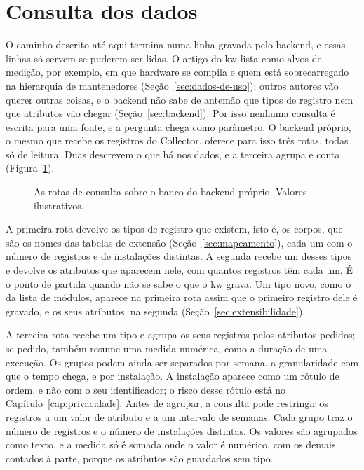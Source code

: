 \section{Consulta dos dados}
\label{sec:consulta}

O caminho descrito até aqui termina numa linha gravada pelo backend, e essas
linhas só servem se puderem ser lidas. O artigo do kw lista como alvos de
medição, por exemplo, em que hardware se compila e quem está sobrecarregado na
hierarquia de mantenedores (Seção~\ref{sec:dados-de-uso}); outros autores vão
querer outras coisas, e o backend não sabe de antemão que tipos de registro nem
que atributos vão chegar (Seção~\ref{sec:backend}). Por isso nenhuma consulta é
escrita para uma fonte, e a pergunta chega como parâmetro. O backend próprio, o
mesmo que recebe os registros do Collector, oferece para isso três rotas, todas
só de leitura. Duas descrevem o que há nos dados, e a terceira agrupa e conta
(Figura~\ref{fig:consulta}).

\begin{figure}[!ht]
  \centering
  \resizebox{\textwidth}{!}{}
  \caption{As rotas de consulta sobre o banco do backend próprio. Valores
    ilustrativos.}
  \label{fig:consulta}
\end{figure}

A primeira rota devolve os tipos de registro que existem, isto é, os corpos,
que são os nomes das tabelas de extensão (Seção~\ref{sec:mapeamento}), cada
um com o número de registros e de instalações distintas. A segunda recebe um
desses tipos e devolve os atributos que aparecem nele, com quantos registros
têm cada um. É o ponto de partida quando não se sabe o que o kw grava. Um tipo novo, como o da lista de módulos, aparece na primeira rota assim
que o primeiro registro dele é gravado, e os seus atributos, na segunda
(Seção~\ref{sec:extensibilidade}).

A terceira rota recebe um tipo e agrupa os seus registros pelos atributos
pedidos; se pedido, também resume uma medida numérica, como a duração de uma
execução. Os grupos podem ainda ser separados por semana, a granularidade com
que o tempo chega, e por instalação. A instalação aparece como um rótulo de ordem, e não com o seu identificador; o
risco desse rótulo está no Capítulo~\ref{cap:privacidade}. Antes
de agrupar, a consulta pode restringir os registros a um valor de atributo e a
um intervalo de semanas. Cada grupo traz o número de registros e o número de
instalações distintas. Os valores são agrupados como texto, e a medida só é
somada onde o valor é numérico, com os demais contados à parte, porque os atributos são guardados sem tipo.

